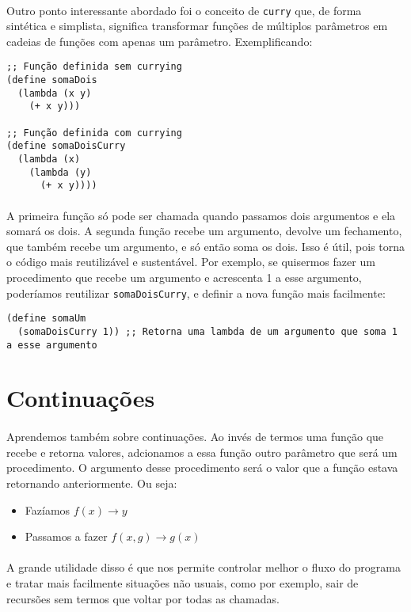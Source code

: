 \documentclass[11pt]{article}
\begin{document}
\paragraph{} Outro ponto interessante abordado foi o conceito de \texttt{curry} que, de forma sintética e simplista, significa transformar funções
de múltiplos parâmetros em cadeias de funções com apenas um parâmetro. Exemplificando:
\begin{verbatim}
;; Função definida sem currying
(define somaDois
  (lambda (x y)
    (+ x y)))

;; Função definida com currying
(define somaDoisCurry
  (lambda (x)
    (lambda (y)
      (+ x y))))
\end{verbatim}

\paragraph{} A primeira função só pode ser chamada quando passamos dois argumentos e ela somará os dois. A segunda função recebe um
argumento, devolve um fechamento, que também recebe um argumento, e só então soma os dois. Isso é útil, pois torna o código mais
reutilizável e sustentável. Por exemplo, se quisermos fazer um procedimento que recebe um argumento e acrescenta 1 a esse argumento,
poderíamos reutilizar \texttt{somaDoisCurry}, e definir a nova função mais facilmente:

\begin{verbatim}
(define somaUm
  (somaDoisCurry 1)) ;; Retorna uma lambda de um argumento que soma 1 a esse argumento
\end{verbatim}

\section{Continuações}
\label{sec:org1fd27a0}
\paragraph{} Aprendemos também sobre continuações. Ao invés de termos uma função que recebe e retorna valores, adcionamos a essa função outro
parâmetro que será um procedimento. O argumento desse procedimento será o valor que a função estava retornando anteriormente. Ou seja:
\begin{itemize}
\item Fazíamos \(f(x) \rightarrow y\)
\item Passamos a fazer \(f(x, g) \rightarrow g(x)\)
\end{itemize}

\paragraph{} A grande utilidade disso é que nos permite controlar melhor o fluxo do programa e tratar mais facilmente situações não usuais, como por
exemplo, sair de recursões sem termos que voltar por todas as chamadas.
\end{document}
